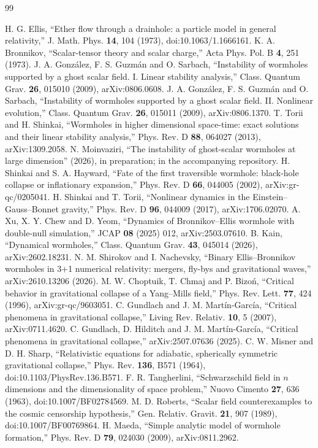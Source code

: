 \documentclass[11pt]{article}
\begin{document}
\begin{thebibliography}{99}

 H. G. Ellis, ``Ether flow through a drainhole: a particle model in general relativity,'' J. Math.
Phys. \textbf{14}, 104 (1973), doi:10.1063/1.1666161.
 K. A. Bronnikov, ``Scalar-tensor theory and scalar charge,'' Acta Phys. Pol. B \textbf{4}, 251
(1973).
 J. A. Gonz\'alez, F. S. Guzm\'an and O. Sarbach, ``Instability of wormholes supported by a ghost scalar
field. I. Linear stability analysis,'' Class. Quantum Grav. \textbf{26}, 015010 (2009), arXiv:0806.0608.
 J. A. Gonz\'alez, F. S. Guzm\'an and O. Sarbach, ``Instability of wormholes supported by a ghost scalar
field. II. Nonlinear evolution,'' Class. Quantum Grav. \textbf{26}, 015011 (2009), arXiv:0806.1370.
 T. Torii and H. Shinkai, ``Wormholes in higher dimensional space-time: exact solutions and their
linear stability analysis,'' Phys. Rev. D \textbf{88}, 064027 (2013), arXiv:1309.2058.
 N. Moinvaziri, ``The instability of ghost-scalar wormholes at large dimension'' (2026), in preparation;
 in the accompanying repository.
 H. Shinkai and S. A. Hayward, ``Fate of the first traversible wormhole: black-hole collapse or
inflationary expansion,'' Phys. Rev. D \textbf{66}, 044005 (2002), arXiv:gr-qc/0205041.
 H. Shinkai and T. Torii, ``Nonlinear dynamics in the Einstein--Gauss--Bonnet gravity,'' Phys. Rev. D
\textbf{96}, 044009 (2017), arXiv:1706.02070.
 A. Xu, X. Y. Chew and D. Yeom, ``Dynamics of Bronnikov--Ellis wormhole with double-null simulation,''
JCAP \textbf{08} (2025) 012, arXiv:2503.07610.
 B. Kain, ``Dynamical wormholes,'' Class. Quantum Grav. \textbf{43}, 045014 (2026), arXiv:2602.18231.
 N. M. Shirokov and I. Nachevsky, ``Binary Ellis--Bronnikov wormholes in 3+1 numerical relativity:
mergers, fly-bys and gravitational waves,'' arXiv:2610.13206 (2026).
 M. W. Choptuik, T. Chmaj and P. Bizo\'n, ``Critical behavior in gravitational collapse of a
Yang--Mills field,'' Phys. Rev. Lett. \textbf{77}, 424 (1996), arXiv:gr-qc/9603051.
 C. Gundlach and J. M. Mart\'in-Garc\'ia, ``Critical phenomena in gravitational collapse,'' Living Rev.
Relativ. \textbf{10}, 5 (2007), arXiv:0711.4620.
 C. Gundlach, D. Hilditch and J. M. Mart\'in-Garc\'ia, ``Critical phenomena in gravitational
collapse,'' arXiv:2507.07636 (2025).
 C. W. Misner and D. H. Sharp, ``Relativistic equations for adiabatic, spherically symmetric
gravitational collapse,'' Phys. Rev. \textbf{136}, B571 (1964), doi:10.1103/PhysRev.136.B571.
 F. R. Tangherlini, ``Schwarzschild field in $n$ dimensions and the dimensionality of space
problem,'' Nuovo Cimento \textbf{27}, 636 (1963), doi:10.1007/BF02784569.
 M. D. Roberts, ``Scalar field counterexamples to the cosmic censorship hypothesis,'' Gen. Relativ.
Gravit. \textbf{21}, 907 (1989), doi:10.1007/BF00769864.
 H. Maeda, ``Simple analytic model of wormhole formation,'' Phys. Rev. D \textbf{79}, 024030 (2009),
arXiv:0811.2962.

\end{thebibliography}
\end{document}
